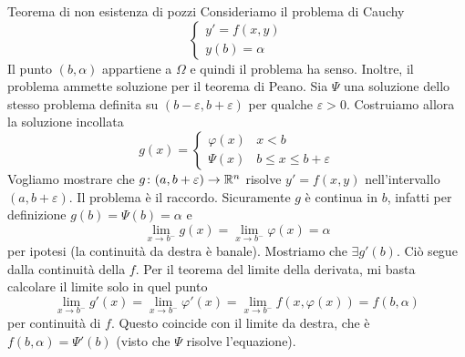 \documentclass[a4paper]{article}
\begin{document}
\begin{radioactive}
\begin{snippetproof}{Teorema di non esistenza di pozzi}
    Consideriamo il problema di Cauchy
    \[
        \begin{cases}
            y' = f(x,y) \\
            y(b) = \alpha
        \end{cases}
    \]
    Il punto \((b,\alpha)\) appartiene a \(\Omega\) e quindi il problema ha senso.
    Inoltre, il problema ammette soluzione per il teorema di Peano.
    Sia \(\Psi\) una soluzione dello stesso problema definita su \((b-\varepsilon, b+\varepsilon)\)
    per qualche \(\varepsilon > 0\). Costruiamo allora la soluzione incollata
    \[
        g(x) =
        \begin{cases}
            \varphi(x) & x < b \\
            \Psi(x) & b \leq x \leq b + \varepsilon
        \end{cases}
    \]
    Vogliamo mostrare che \(g \colon (a,b+\varepsilon) \to \mathbb{R}^n\)
    risolve \(y' = f(x,y)\) nell'intervallo \((a,b+\varepsilon)\).
    Il problema è il raccordo.
    Sicuramente \(g\) è continua in \(b\), infatti per definizione
    \(g(b) = \Psi(b) = \alpha\) e \[
        \lim_{x \to b^-} g(x) = \lim_{x \to b^-} \varphi(x) = \alpha
    \]
    per ipotesi (la continuità da destra è banale).
    Mostriamo che \(\exists g'(b)\).
    Ciò segue dalla continuità della \(f\).
    Per il teorema del limite della derivata, mi basta
    calcolare il limite solo in quel punto
    \[
        \lim_{x\to b^-} g'(x) = \lim_{x\to b^-} \varphi'(x)
        = \lim_{x\to b^-} f(x,\varphi(x)) = f(b,\alpha)
    \]
    per continuità di \(f\).
    Questo coincide con il limite da destra, che è \(f(b,\alpha) = \Psi'(b)\)
    (visto che \(\Psi\) risolve l'equazione).
\end{snippetproof}
\end{radioactive}
\end{document}
